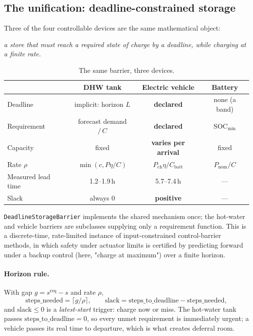 \documentclass[11pt]{article}
\begin{document}
\subsection{The unification: deadline-constrained storage}
\label{sec:deadline}

Three of the four controllable devices are the same mathematical object:

\begin{center}
\emph{a store that must reach a required state of charge by a deadline, while
charging at a finite rate.}
\end{center}

\begin{table}[h]
\centering
\caption{The same barrier, three devices.}
\label{tab:unification}
\small
\begin{tabular}{lccc}
\toprule
 & DHW tank & Electric vehicle & Battery \\
\midrule
Deadline & implicit: horizon $L$ & \textbf{declared} & none (a band) \\
Requirement & forecast demand $/\,C$ & \textbf{declared} & $\text{SOC}_{\min}$ \\
Capacity & fixed & \textbf{varies per arrival} & fixed \\
Rate $\rho$ & $\min(c, P\eta/C)$ & $P_{\text{ch}}\eta / C_{\text{batt}}$ & $P_{\text{nom}}/C$ \\
Measured lead time & 1.2--1.9\,h & 5.7--7.4\,h & --- \\
Slack & always 0 & \textbf{positive} & --- \\
\bottomrule
\end{tabular}
\end{table}

\texttt{DeadlineStorageBarrier} implements the shared mechanism once; the
hot-water and vehicle barriers are subclasses supplying only a requirement
function. This is a discrete-time, rate-limited instance of input-constrained
control-barrier methods, in which safety under actuator limits is certified by
predicting forward under a backup control (here, "charge at maximum") over a
finite horizon.

\paragraph{Horizon rule.} With gap $g = s^{\text{req}} - s$ and rate $\rho$,
\begin{equation}
\text{steps\_needed} = \lceil g / \rho \rceil, \qquad
\text{slack} = \text{steps\_to\_deadline} - \text{steps\_needed},
\label{eq:horizon-rule}
\end{equation}
and $\text{slack} \le 0$ is a \emph{latest-start} trigger: charge now or miss.
The hot-water tank passes $\text{steps\_to\_deadline} = 0$, so every unmet
requirement is immediately urgent; a vehicle passes its real time to departure,
which is what creates deferral room.
\end{document}
